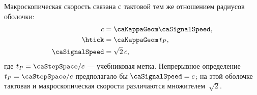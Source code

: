 Макроскопическая скорость связана с тактовой тем же отношением радиусов оболочки:
\begin{align}
  c &= \caKappaGeom \caSignalSpeed, \\
  \htick &= \caKappaGeom\, t_P, \\
  \caSignalSpeed &= \sqrt{2}\,c,
  \label{eq:hull-speed-bridge}
\end{align}
где $t_P=\caStepSpace/c$ --- учебниковая метка.
Непрерывное определение $t_P=\caStepSpace/c$ предполагало бы $\caSignalSpeed=c$; на этой оболочке тактовая и макроскопическая скорости различаются множителем~$\sqrt{2}$.

